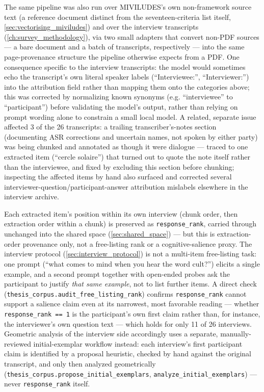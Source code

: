 The same pipeline was also run over MIVILUDES's own non-framework source text (a reference document distinct from the seventeen-criteria list itself, \ref{sec:vectorising_miviludes}) and over the interview transcripts (\ref{ch:survey_methodology}), via two small adapters that convert non-PDF sources — a bare document and a batch of transcripts, respectively — into the same page-provenance structure the pipeline otherwise expects from a PDF. One consequence specific to the interview transcripts: the model would sometimes echo the transcript's own literal speaker labels (\enquote{Interviewee:}, \enquote{Interviewer:}) into the attribution field rather than mapping them onto the categories above; this was corrected by normalizing known synonyms (e.g. \enquote{interviewee} to \enquote{participant}) before validating the model's output, rather than relying on prompt wording alone to constrain a small local model. A related, separate issue affected 3 of the 26 transcripts: a trailing transcriber's-notes section (documenting ASR corrections and uncertain names, not spoken by either party) was being chunked and annotated as though it were dialogue — traced to one extracted item (\enquote{cercle solaire}) that turned out to quote the note itself rather than the interviewee, and fixed by excluding this section before chunking; inspecting the affected items by hand also surfaced and corrected several interviewer-question/participant-answer attribution mislabels elsewhere in the interview archive.

Each extracted item's position within its own interview (chunk order, then extraction order within a chunk) is preserved as \texttt{response\_rank}, carried through unchanged into the shared space (\ref{sec:shared_space}) — but this is extraction-order provenance only, not a free-listing rank or a cognitive-salience proxy. The interview protocol (\ref{sec:interview_protocol}) is not a multi-item free-listing task: one prompt (\enquote{what comes to mind when you hear the word cult?}) elicits a single example, and a second prompt together with open-ended probes ask the participant to justify \textit{that same example}, not to list further items. A direct check (\texttt{thesis\_corpus.audit\_free\_listing\_rank}) confirms \texttt{response\_rank} cannot support a salience claim even at its narrowest, most favorable reading — whether \texttt{response\_rank == 1} is the participant's own first claim rather than, for instance, the interviewer's own question text — which holds for only 11 of 26 interviews. Geometric analysis of the interview side accordingly uses a separate, manually-reviewed initial-exemplar workflow instead: each interview's first participant claim is identified by a proposal heuristic, checked by hand against the original transcript, and only then analyzed geometrically (\texttt{thesis\_corpus.propose\_initial\_exemplars}, \texttt{analyze\_initial\_exemplars}) — never \texttt{response\_rank} itself.

